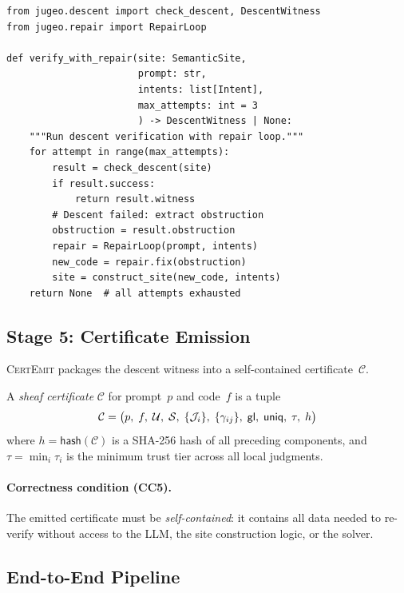 \documentclass[11pt]{article}
\newcommand{\ProofCert}{\mathcal{C}}
\newcommand{\CoverFam}{\mathcal{U}}
\newcommand{\Cocycle}{\gamma}
\newcommand{\GlueMap}{\mathsf{gl}}
\newcommand{\UniqWit}{\mathsf{uniq}}
\newcommand{\CertEmit}{\textsc{CertEmit}}
\newcommand{\certhash}{\mathsf{hash}}
\begin{document}
\begin{lstlisting}[caption={Descent verification with repair loop.},label={lst:descent}]
from jugeo.descent import check_descent, DescentWitness
from jugeo.repair import RepairLoop

def verify_with_repair(site: SemanticSite,
                       prompt: str,
                       intents: list[Intent],
                       max_attempts: int = 3
                       ) -> DescentWitness | None:
    """Run descent verification with repair loop."""
    for attempt in range(max_attempts):
        result = check_descent(site)
        if result.success:
            return result.witness
        # Descent failed: extract obstruction
        obstruction = result.obstruction
        repair = RepairLoop(prompt, intents)
        new_code = repair.fix(obstruction)
        site = construct_site(new_code, intents)
    return None  # all attempts exhausted
\end{lstlisting}

\subsection{Stage 5: Certificate Emission}\label{sec:stage5}

\CertEmit{} packages the descent witness into a self-contained
certificate~$\ProofCert$.

\begin{definition}\label{def:sheaf-cert}
A \emph{sheaf certificate} $\ProofCert$ for prompt~$p$ and
code~$f$ is a tuple
\[
  \ProofCert = \bigl(p,\; f,\; \CoverFam,\; \Site,\;
  \{\J_i\},\; \{\Cocycle_{ij}\},\; \GlueMap,\; \UniqWit,\;
  \tau,\; h\bigr)
\]
where $h = \certhash(\ProofCert)$ is a SHA-256 hash of all preceding
components, and $\tau = \min_i \tau_i$ is the minimum trust tier
across all local judgments.
\end{definition}

\paragraph{Correctness condition (CC5).}
The emitted certificate must be \emph{self-contained}: it contains
all data needed to re-verify without access to the LLM, the site
construction logic, or the solver.

\subsection{End-to-End Pipeline}\label{sec:e2e-alg}
\end{document}
